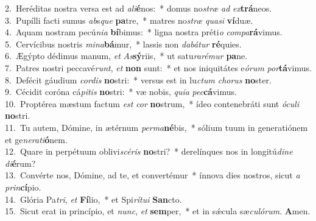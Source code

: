 {2.~}Heréditas nostra versa est ad \textit{a}\textit{li}\textbf{é}nos:~* domus no\textit{stræ} \textit{ad} \textit{ex}\textbf{trá}neos.\\
{3.~}Pupílli facti sumus \textit{ab}s\textit{que} \textbf{pa}tre,~* matres no\textit{stræ} \textit{qua}\textit{si} \textbf{ví}duæ.\\
{4.~}Aquam nostram pecú\textit{ni}\textit{a} \textbf{bí}bimus:~* ligna nostra préti\textit{o} \textit{com}\textit{pa}\textbf{rá}vimus.\\
{5.~}Cervícibus nostris \textit{mi}\textit{na}\textbf{bá}mur,~* lassis non \textit{da}\textit{bá}\textit{tur} \textbf{ré}quies.\\
{6.~}Ægýpto dédimus manum, \textit{et} \textit{As}\textbf{sý}riis,~* ut satu\textit{ra}\textit{ré}\textit{mur} \textbf{pa}ne.\\
{7.~}Patres nostri peccavé\textit{runt}, \textit{et} \textbf{non} sunt:~* et nos iniquitátes e\textit{ó}\textit{rum} \textit{por}\textbf{tá}vimus.\\
{8.~}Defécit gáudium \textit{cor}\textit{dis} \textbf{no}stri:~* versus est in lu\textit{ctum} \textit{cho}\textit{rus} \textbf{no}ster.\\
{9.~}Cécidit coróna cá\textit{pi}\textit{tis} \textbf{no}stri:~* væ nobis, \textit{qui}\textit{a} \textit{pec}\textbf{cá}vimus.\\
{10.~}Proptérea mæstum factum \textit{est} \textit{cor} \textbf{no}strum,~* ídeo contenebráti sunt \textit{ó}\textit{cu}\textit{li} \textbf{no}stri.\\
{11.~}Tu autem, Dómine, in ætérnum \textit{per}\textit{ma}\textbf{né}bis,~* sólium tuum in generatiónem et ge\textit{ne}\textit{ra}\textit{ti}\textbf{ó}nem.\\
{12.~}Quare in perpétuum oblivi\textit{scé}\textit{ris} \textbf{no}stri?~* derelínques nos in longitú\textit{di}\textit{ne} \textit{di}\textbf{é}rum?\\
{13.~}Convérte nos, Dómine, ad te, et convertémur~* ínnova dies nostros, sicut \textit{a} \textit{prin}\textbf{cí}pio.\\
{14.~}Glória Pa\textit{tri}, \textit{et} \textbf{Fí}lio,~* et Spi\textit{rí}\textit{tu}\textit{i} \textbf{San}cto.\\
{15.~}Sicut erat in princípio, et \textit{nunc}, \textit{et} \textbf{sem}per,~* et in sǽcula sæ\textit{cu}\textit{ló}\textit{rum}. \textbf{A}men.\\
